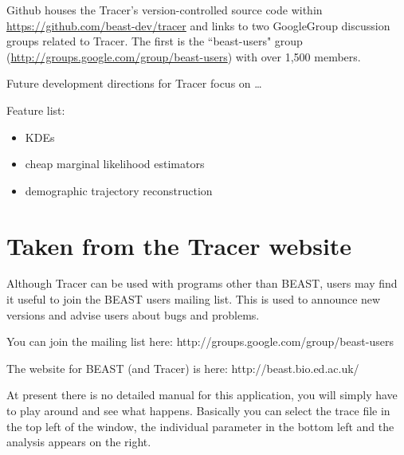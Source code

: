 \documentclass{bioinfo}
\begin{document}
Github houses the Tracer's version-controlled source code within \url{https://github.com/beast-dev/tracer} and links to two GoogleGroup discussion groups related to Tracer.  
The first is the ``beast-users" group (\url{http://groups.google.com/group/beast-users}) with over 1,500 members. 

Future development directions for Tracer focus on \ldots


Feature list:
\begin{itemize}
\item KDEs
\item cheap marginal likelihood estimators
\item demographic trajectory reconstruction
\end{itemize}

\section*{Taken from the Tracer website}


Although Tracer can be used with programs other than BEAST, users may find it useful to join the BEAST users mailing list. This is used to announce new versions and advise users about bugs and problems.

You can join the mailing list here:
http://groups.google.com/group/beast-users

The website for BEAST (and Tracer) is here:
http://beast.bio.ed.ac.uk/

At present there is no detailed manual for this application, you will simply have to play around and see what happens. Basically you can select the trace file in the top left of the window, the individual parameter in the bottom left and the analysis appears on the right.

\end{document}
